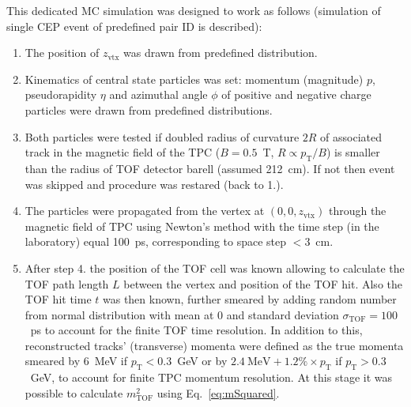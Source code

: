 This dedicated MC simulation was designed to work as follows (simulation of single CEP event of predefined pair ID is described):
\begin{enumerate}
 \item The position of $z_{\text{vtx}}$ was drawn from predefined distribution.
 \item Kinematics of central state particles was set: momentum (magnitude) $p$, pseudorapidity $\eta$ and azimuthal angle $\phi$ of positive and negative charge particles were drawn from predefined distributions.
 \item Both particles were tested if doubled radius of curvature $2R$ of associated track in the magnetic field of the TPC ($B=0.5$~T, $R \propto p_{\text{T}}/B$) is smaller than the radius of TOF detector barell (assumed 212~cm). If not then event was skipped and procedure was restared (back to 1.).
 \item The particles were propagated from the vertex at $(0,0,z_{\text{vtx}})$ through the magnetic field of TPC using Newton's method with the time step (in the laboratory) equal 100~ps, corresponding to space step $<3$~cm.
 \item After step 4. the position of the TOF cell was known allowing to calculate the TOF path length $L$ between the vertex and position of the TOF hit. Also the TOF hit time $t$ was then known, further smeared by adding random number from normal distribution with mean at 0 and standard deviation $\sigma_{\text{TOF}}=100$~ps to account for the finite TOF time resolution. In addition to this, reconstructed tracks' (transverse) momenta were defined as the true momenta smeared by 6~MeV if $p_{\text{T}}<0.3$~GeV or by $2.4~\text{MeV} + 1.2\%\times p_{\text{T}}$ if $p_{\text{T}}>0.3$~GeV, to account for finite TPC momentum resolution. At this stage it was possible to calculate $m^{2}_{\text{TOF}}$ using Eq.~\eqref{eq:mSquared}.

\end{enumerate}
